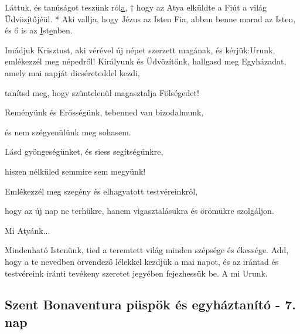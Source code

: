 \documentclass[twoside]{article}
\begin{document}
Láttuk, és tanúságot teszünk ról\underline{a}, † hogy az Atya elküldte a Fiút a világ Üdvöz\underline{í}tőjéül. * Aki vallja, hogy Jézus az Isten Fia, abban benne marad az Isten, és ő is az \underline{I}st\underline{e}nben.







\begin{preces}{Imádjuk Krisztust, aki vérével új népet szerzett magának, és kérjük:}{Urunk, emlékezzél meg népedről!}
  Királyunk és Üdvözítőnk, hallgasd meg Egyházadat, amely mai napját dicséreteddel kezdi,

  \reddash tanítsd meg, hogy szüntelenül magasztalja Fölségedet!

  Reményünk és Erősségünk, tebenned van bizodalmunk,

  \reddash és nem szégyenülünk meg sohasem.

  Lásd gyöngeségünket, és siess segítségünkre,

  \reddash hiszen nélküled semmire sem megyünk!

  Emlékezzél meg szegény és elhagyatott testvéreinkről,

  \reddash hogy az új nap ne terhükre, hanem vigasztalásukra és örömükre szolgáljon.
\end{preces}
Mi Atyánk...

Mindenható Istenünk, tied a teremtett világ minden szépsége és ékessége. Add, hogy a te nevedben örvendező lélekkel kezdjük a mai napot, és az irántad és testvéreink iránti tevékeny szeretet jegyében fejezhessük be. A mi Urunk.


\subsection*{Szent Bonaventura püspök és egyháztanító - 7. nap}

\begin{center}\end{center}
\end{document}
